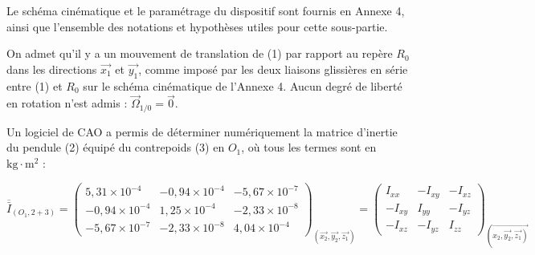 Le schéma cinématique et le paramétrage du dispositif sont fournis en Annexe 4, ainsi que l'ensemble des notations et hypothèses utiles pour cette sous-partie.

On admet qu'il y a un mouvement de translation de (1) par rapport au repère $R_{0}$ dans les directions $\overrightarrow{x_{1}}$ et $\overrightarrow{y_{1}}$, comme imposé par les deux liaisons glissières en série entre (1) et $R_{0}$ sur le schéma cinématique de l'Annexe 4. Aucun degré de liberté en rotation n'est admis : $\vec{\Omega}_{1 / 0}=\overrightarrow{0}$.

Un logiciel de CAO a permis de déterminer numériquement la matrice d'inertie du pendule (2) équipé du contrepoids (3) en $O_{1}$, où tous les termes sont en $\mathrm{kg} \cdot \mathrm{m}^{2}$ :

$$
\overline{\bar{I}}_{\left(O_{1}, 2+3\right)}=\left(\begin{array}{ccc}
5,31 \times 10^{-4} & -0,94 \times 10^{-4} & -5,67 \times 10^{-7} \\
-0,94 \times 10^{-4} & 1,25 \times 10^{-4} & -2,33 \times 10^{-8} \\
-5,67 \times 10^{-7} & -2,33 \times 10^{-8} & 4,04 \times 10^{-4}
\end{array}\right)_{\left(\overrightarrow{x_{2}}, \overrightarrow{y_{2}}, \overrightarrow{z_{1}}\right)}=\left(\begin{array}{ccc}
I_{x x} & -I_{x y} & -I_{x z} \\
-I_{x y} & I_{y y} & -I_{y z} \\
-I_{x z} & -I_{y z} & I_{z z}
\end{array}\right)_{\left(\overrightarrow{\left.x_{2}, \overrightarrow{y_{2}}, \overrightarrow{z_{1}}\right)}\right.}
$$





